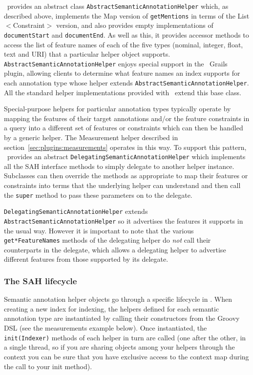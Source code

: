 \Mimir\ provides an abstract class {\tt AbstractSemanticAnnotationHelper}
which, as described above, implements the Map version of {\tt getMentions} in
terms of the List$<$Constraint$>$ version, and also provides empty
implementations of {\tt documentStart} and {\tt documentEnd}.  As well as this,
it provides accessor methods to access the list of feature names of each of the
five types (nominal, integer, float, text and URI) that a particular helper
object supports.  {\tt AbstractSemanticAnnotationHelper} enjoys special support
in the \Mimir\ Grails plugin, allowing clients to determine what feature names
an index supports for each annotation type whose helper extends
{\tt AbstractSemanticAnnotationHelper}.  All the standard helper
implementations provided with \Mimir\ extend this base class.

Special-purpose helpers for particular annotation types typically operate by
mapping the features of their target annotations and/or the feature constraints
in a query into a different set of features or constraints which can then be
handled by a generic helper.  The Measurement helper described in
section~\ref{sec:plugins:measurements} operates in this way.  To support
this pattern, \Mimir\ provides an abstract
{\tt DelegatingSemanticAnnotationHelper} which implements all the SAH interface
methods to simply delegate to another helper instance.  Subclasses can then
override the methods as appropriate to map their features or constraints into
terms that the underlying helper can understand and then call the {\tt super}
method to pass these parameters on to the delegate.

{\tt DelegatingSemanticAnnotationHelper} extends
{\tt AbstractSemanticAnnotationHelper} so it advertises the features it
supports in the usual way.  However it is important to note that the various
\verb|get*FeatureNames| methods of the delegating helper do {\em not} call
their counterparts in the delegate, which allows a delegating helper to
advertise different features from those supported by its delegate.

\subsubsection{The SAH lifecycle}

Semantic annotation helper objects go through a specific lifecycle in \Mimir.
When creating a new index for indexing, the helpers defined for each semantic
annotation type are instantiated by calling their constructors
from the Groovy DSL (see the measurements example below).
Once instantiated, the {\tt init(Indexer)} methods of each helper in turn are
called (one after the other, in a single thread, so if you are sharing objects
among your helpers through the context you can be sure that you have exclusive
access to the context map during the call to your init method).


